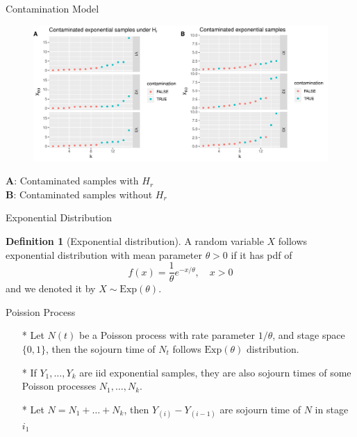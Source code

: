 \documentclass{beamer}
\theoremstyle{definition}
\newtheorem{defn}{Definition}
\theoremstyle{remark}
\begin{document}
\begin{frame}{Contamination Model }
    \begin{figure}
        \includegraphics[scale = 0.4]{plot_0.pdf}
    \end{figure}
    \textbf{A}: Contaminated samples with $H_r$ \\
    \textbf{B}: Contaminated samples without $H_r$
\end{frame}

\begin{frame}{Exponential Distribution}
    \begin{defn}[Exponential distribution]
        A random variable $X$ follows exponential distribution with mean parameter $\theta > 0$ if it has pdf of
        \[ 
            f(x) = \frac{1}{\theta} e^{-x/\theta}, \quad x >0
            \]
            and we denoted it by $X \sim \mathrm{Exp}(\theta)$.
        \end{defn}
    \end{frame}
    
    \begin{frame}{Poission Process}
       \begin{itemize}
           \item[*] Let $N(t)$ be a Poisson process with rate parameter $1/\theta$, and stage space $\{0,1\}$,
           then the sojourn time of $N_t$ follows $\mathrm{Exp}(\theta)$ distribution.
            \item[*] If $Y_1,\ldots,Y_k$ are iid exponential samples, they are also sojourn times of some Poisson processes $N_1,\ldots,N_k$.
            \item[*] Let $N = N_1+ \ldots+N_k$, then $Y_{(i)} - Y_{(i-1)}$ are sojourn time of $N$ in stage $i_1$ 
       \end{itemize}
    \end{frame}
        
\end{document}
